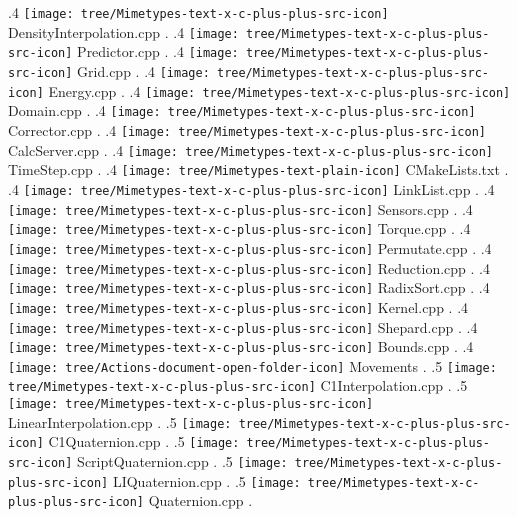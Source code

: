{.4 { \texttt{[image: tree/Mimetypes-text-x-c-plus-plus-src-icon]} DensityInterpolation.cpp }.
.4 { \texttt{[image: tree/Mimetypes-text-x-c-plus-plus-src-icon]} Predictor.cpp }.
.4 { \texttt{[image: tree/Mimetypes-text-x-c-plus-plus-src-icon]} Grid.cpp }.
.4 { \texttt{[image: tree/Mimetypes-text-x-c-plus-plus-src-icon]} Energy.cpp }.
.4 { \texttt{[image: tree/Mimetypes-text-x-c-plus-plus-src-icon]} Domain.cpp }.
.4 { \texttt{[image: tree/Mimetypes-text-x-c-plus-plus-src-icon]} Corrector.cpp }.
.4 { \texttt{[image: tree/Mimetypes-text-x-c-plus-plus-src-icon]} CalcServer.cpp }.
.4 { \texttt{[image: tree/Mimetypes-text-x-c-plus-plus-src-icon]} TimeStep.cpp }.
.4 { \texttt{[image: tree/Mimetypes-text-plain-icon]} CMakeLists.txt }.
.4 { \texttt{[image: tree/Mimetypes-text-x-c-plus-plus-src-icon]} LinkList.cpp }.
.4 { \texttt{[image: tree/Mimetypes-text-x-c-plus-plus-src-icon]} Sensors.cpp }.
.4 { \texttt{[image: tree/Mimetypes-text-x-c-plus-plus-src-icon]} Torque.cpp }.
.4 { \texttt{[image: tree/Mimetypes-text-x-c-plus-plus-src-icon]} Permutate.cpp }.
.4 { \texttt{[image: tree/Mimetypes-text-x-c-plus-plus-src-icon]} Reduction.cpp }.
.4 { \texttt{[image: tree/Mimetypes-text-x-c-plus-plus-src-icon]} RadixSort.cpp }.
.4 { \texttt{[image: tree/Mimetypes-text-x-c-plus-plus-src-icon]} Kernel.cpp }.
.4 { \texttt{[image: tree/Mimetypes-text-x-c-plus-plus-src-icon]} Shepard.cpp }.
.4 { \texttt{[image: tree/Mimetypes-text-x-c-plus-plus-src-icon]} Bounds.cpp }.
.4 { \texttt{[image: tree/Actions-document-open-folder-icon]} Movements }.
.5 { \texttt{[image: tree/Mimetypes-text-x-c-plus-plus-src-icon]} C1Interpolation.cpp }.
.5 { \texttt{[image: tree/Mimetypes-text-x-c-plus-plus-src-icon]} LinearInterpolation.cpp }.
.5 { \texttt{[image: tree/Mimetypes-text-x-c-plus-plus-src-icon]} C1Quaternion.cpp }.
.5 { \texttt{[image: tree/Mimetypes-text-x-c-plus-plus-src-icon]} ScriptQuaternion.cpp }.
.5 { \texttt{[image: tree/Mimetypes-text-x-c-plus-plus-src-icon]} LIQuaternion.cpp }.
.5 { \texttt{[image: tree/Mimetypes-text-x-c-plus-plus-src-icon]} Quaternion.cpp }.
}
